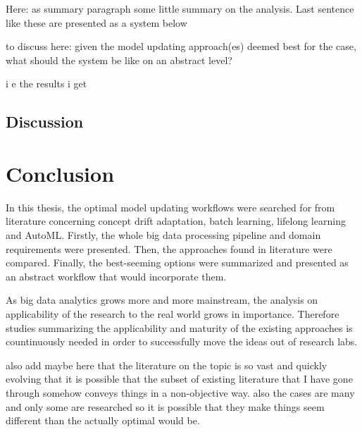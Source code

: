 

Here: as summary paragraph some little summary on the analysis. Last sentence like these are presented as a system below

to discuss here: given the model updating approach(es) deemed best for the case, what should the system be like on an abstract level?

i e the results i get


\section{Discussion}

\chapter{Conclusion}

In this thesis, the optimal model updating workflows were searched for from literature concerning concept drift adaptation, batch learning, lifelong learning and AutoML. Firstly, the whole big data processing pipeline and domain requirements were presented. Then, the approaches found in literature were compared. Finally, the best-seeming options were summarized and presented as an abstract workflow that would incorporate them.

As big data analytics grows more and more mainstream, the analysis on applicability of the research to the real world grows in importance. Therefore studies summarizing the applicability and maturity of the existing approaches is countinuously needed in order to successfully move the ideas out of research labs.


also add maybe here that the literature on the topic is so vast and quickly evolving that it is possible that the subset of existing literature that I have gone through somehow conveys things in a non-objective way. also the cases are many and only some are researched so it is possible that they make things seem different than the actually optimal would be.

